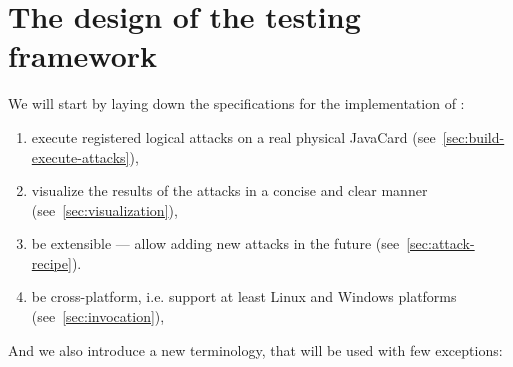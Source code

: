 \section{The design of the testing framework}\label{chp:testing-tool}


    We will start by laying down the specifications for the implementation of \projectname:
    \begin{enumerate}
        \item execute registered logical attacks on a real physical JavaCard (see~\ref{sec:build-execute-attacks}),
        \item visualize the results of the attacks in a concise and clear manner (see~\ref{sec:visualization}),
        \item be extensible --- allow adding new attacks in the future (see~\ref{sec:attack-recipe}).
        \item be cross-platform, i.e. support at least Linux and Windows platforms (see~\ref{sec:invocation}),
    \end{enumerate}


    And we also introduce a new terminology, that will be used with few exceptions:

